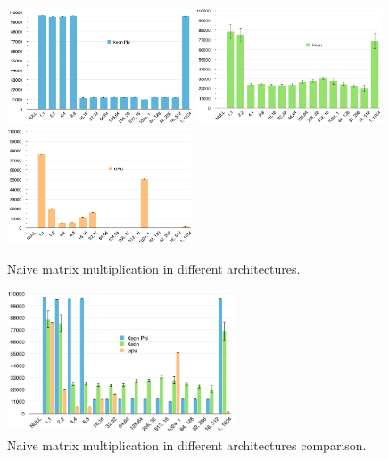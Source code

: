 \begin{figure}[!h]
    \centering
    \includegraphics[width=0.49\textwidth]{figures/naive_phi.png}
    \includegraphics[width=0.49\textwidth]{figures/naive_cpu.png}
    \includegraphics[width=0.49\textwidth]{figures/naive_gpu.png}
    \caption{Naive matrix multiplication in different architectures.}
    \label{Naive}
\end{figure}

\begin{figure}[!h]
    \centering
    \includegraphics[width=0.6\textwidth]{figures/naive_comp.png}
    \caption{Naive matrix multiplication in different architectures comparison.}
    \label{NaiveComp}
\end{figure}

